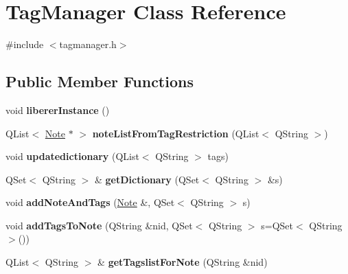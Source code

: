 \hypertarget{classTagManager}{\section{\-Tag\-Manager \-Class \-Reference}
\label{classTagManager}
}


{\ttfamily \#include $<$tagmanager.\-h$>$}

\subsection*{\-Public \-Member \-Functions}
\begin{DoxyCompactItemize}
\item 
\hypertarget{classTagManager_a7fa940878e143a82e68659126b2f6192}{void {\bfseries liberer\-Instance} ()}\label{classTagManager_a7fa940878e143a82e68659126b2f6192}

\item 
\hypertarget{classTagManager_a8848ee002c31d81493822b2103ab6f87}{\-Q\-List$<$ \hyperlink{classNote}{\-Note} $\ast$ $>$ {\bfseries note\-List\-From\-Tag\-Restriction} (\-Q\-List$<$ \-Q\-String $>$)}\label{classTagManager_a8848ee002c31d81493822b2103ab6f87}

\item 
\hypertarget{classTagManager_ae54ef7fd6982b88a22a77905dac30402}{void {\bfseries updatedictionary} (\-Q\-List$<$ \-Q\-String $>$ tags)}\label{classTagManager_ae54ef7fd6982b88a22a77905dac30402}

\item 
\hypertarget{classTagManager_a691e9e29b5ea11aaca6f2dfe32054503}{\-Q\-Set$<$ \-Q\-String $>$ \& {\bfseries get\-Dictionary} (\-Q\-Set$<$ \-Q\-String $>$ \&s)}\label{classTagManager_a691e9e29b5ea11aaca6f2dfe32054503}

\item 
\hypertarget{classTagManager_a3e7f7e2e04ad5400e51794ebadd09ae7}{void {\bfseries add\-Note\-And\-Tags} (\hyperlink{classNote}{\-Note} \&, \-Q\-Set$<$ \-Q\-String $>$ s)}\label{classTagManager_a3e7f7e2e04ad5400e51794ebadd09ae7}

\item 
\hypertarget{classTagManager_ac3f165f78bd418d8dd33868a6f362a62}{void {\bfseries add\-Tags\-To\-Note} (\-Q\-String \&nid, \-Q\-Set$<$ \-Q\-String $>$ s=\-Q\-Set$<$ \-Q\-String $>$())}\label{classTagManager_ac3f165f78bd418d8dd33868a6f362a62}

\item 
\hypertarget{classTagManager_a8b27158d4d629b4497495bc7491ad2f3}{\-Q\-List$<$ \-Q\-String $>$ \& {\bfseries get\-Tagslist\-For\-Note} (\-Q\-String \&nid)}\label{classTagManager_a8b27158d4d629b4497495bc7491ad2f3}

\end{DoxyCompactItemize}
